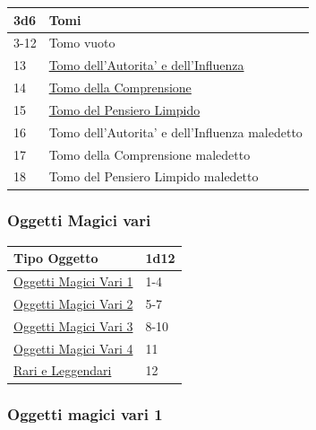 \begin{multicols}{2}
{\medskip\hypertarget{Tomi}{}

{\small\begin{tabularx}{0.45\textwidth}{lX}
		\toprule
\textbf{3d6} & \textbf{Tomi}\\
\toprule
3-12 & Tomo vuoto\\
13 & \hyperlink{Tomo dell'Autorita' e dell'Influenza}{Tomo dell'Autorita' e dell'Influenza}\\
14 & \hyperlink{Tomo della Comprensione}{Tomo della Comprensione}\\
15 & \hyperlink{Tomo del Pensiero Limpido}{Tomo del Pensiero Limpido}\\
16 & Tomo dell'Autorita' e dell'Influenza maledetto\\
17 & Tomo della Comprensione maledetto\\
18 & Tomo del Pensiero Limpido maledetto
\end{tabularx}}

\subsubsection{Oggetti Magici vari}\hypertarget{oggettimagicivari}{}\label{oggettimagicivari}

{\small\begin{tabular}{ll}
		\toprule
\textbf{Tipo Oggetto} & \textbf{1d12}\\
\toprule
\hyperlink{Oggetti Magici Vari 1}{Oggetti Magici Vari 1}&1-4\\
\hyperlink{Oggetti Magici Vari 2}{Oggetti Magici Vari 2}&5-7\\
\hyperlink{Oggetti Magici Vari 3}{Oggetti Magici Vari 3}&8-10\\
\hyperlink{Oggetti Magici Vari 4}{Oggetti Magici Vari 4}&11\\
\hyperlink{Rari e Leggendari}{Rari e Leggendari}&12
\end{tabular}}

\subsubsection{Oggetti magici vari 1}\hypertarget{Oggetti Magici Vari 1}{}

}
\end{multicols}
